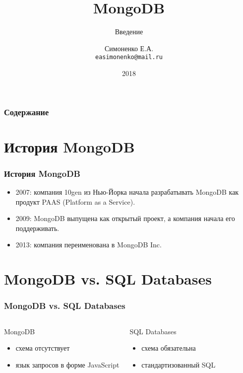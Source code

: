 \documentclass[11pt]{beamer}
\begin{document}
\author{Симоненко Е.А. \\ \texttt{easimonenko@mail.ru}}
\title{MongoDB}
\subtitle{Введение}
\date{2018}

\begin{frame}
\titlepage
\end{frame}

\begin{frame}
\frametitle{Содержание}
\tableofcontents
\end{frame}

\section{История MongoDB}

\begin{frame}
\frametitle{История MongoDB}
\begin{itemize}
	\item 2007: компания 10gen из Нью-Йорка начала разрабатывать MongoDB как 
	продукт PAAS (Platform as a Service).
	\item 2009: MongoDB выпущена как открытый проект, а компания начала его 
	поддерживать.
	\item 2013: компания переименована в MongoDB Inc.
\end{itemize}
\end{frame}

\section{MongoDB vs. SQL Databases}

\begin{frame}
\frametitle{MongoDB vs. SQL Databases}
\begin{columns}
	\begin{block}{MongoDB}
		\begin{itemize}
			\item схема отсутствует
			\item язык запросов в форме JavaScript
		\end{itemize}
	\end{block}
	
	\begin{block}{SQL Databases}
		\begin{itemize}
			\item схема обязательна
			\item стандартизованный SQL
		\end{itemize}
	\end{block}
\end{columns}
\end{frame}
\end{document}
